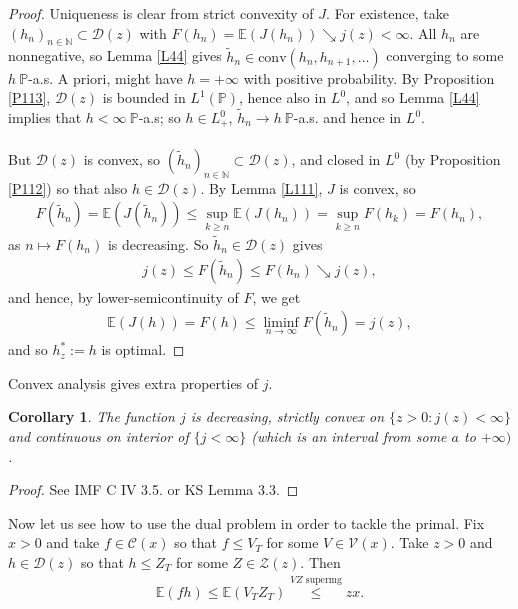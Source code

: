\documentclass[12pt,a4paper, twoside]{article}
\newtheorem{cor}{Corollary}[section]
\theoremstyle{definition}
\newcommand{\EE}{\mathbb{E}} %
\newcommand{\PP}{\mathbb{P}} %
\begin{document}
\begin{proof}
Uniqueness is clear  from strict convexity of $J$. For existence, take $(h_n)_{n \in \mathbb{N}} \subset \mathcal{D}(z)$ with $F(h_n)= \EE(J(h_n)) \searrow j(z) < \infty$. All $h_n$ are nonnegative, so Lemma \ref{L44} gives $\widetilde{h}_n \in \text{conv}(h_n, h_{n+1}, \dots )$ converging to some $h \ \PP$-a.s. A priori, might have $h= + \infty$ with positive probability. By Proposition \ref{P113}, $\mathcal{D}(z)$ is bounded in $L^1( \PP)$, hence also in $L^0$, and so Lemma \ref{L44} implies that $h < \infty \ \PP$-a.s; so $h \in L_+^0$, $\widetilde{h}_n \to h \ \PP$-a.s. and hence in $L^0$. \\
\\
But $\mathcal{D}(z)$ is convex, so $(\widetilde{h}_n)_{n \in \mathbb{N}} \subset \mathcal{D}(z)$, and closed in $L^0$ (by Proposition \ref{P112}) so that also $h \in \mathcal{D}(z)$. By Lemma \ref{L111}, $J$ is convex, so
\begin{align*}
F( \widetilde{h}_n) = \EE(J( \widetilde{h}_n)) \leq \sup_{k \geq n} \EE(J(h_n)) = \sup_{k \geq n } F(h_k) = F(h_n),
\end{align*}
as $n \mapsto F(h_n)$ is decreasing. So $\widetilde{h}_n \in \mathcal{D}(z)$ gives 
\begin{align*}
j(z) \leq F( \widetilde{h}_n) \leq F(h_n) \searrow j(z),
\end{align*}
and hence, by lower-semicontinuity of $F$, we get
\begin{align*}
\EE(J(h)) = F(h) \leq \liminf_{n \to \infty} F( \widetilde{h}_n) = j(z),
\end{align*}
and so $h_z^* := h$ is optimal. 
\end{proof}
Convex analysis gives extra properties of $j$.
\begin{cor} \label{C115} The function $j$ is decreasing, strictly convex on $\{ z >0: j(z) < \infty\}$ and continuous on interior of $\{j < \infty\}$ (which is an interval from some $a$ to $+ \infty)$.
\end{cor}
\begin{proof}
See IMF C IV 3.5. or KS Lemma 3.3.
\end{proof}
Now let us see how to use the dual problem in order to tackle the primal. Fix $x>0$ and take $f \in \mathcal{C}(x)$ so that $f \leq V_T$ for some $V \in \mathcal{V}(x)$. Take $z>0$ and $h \in \mathcal{D}(z)$ so that $h \leq Z_T$ for some $Z \in \mathcal{Z}(z)$. Then 
\begin{align*}
\EE(fh) \leq \EE(V_T Z_T) \overset{VZ \text{ supermg}}\leq zx.
\end{align*}
\end{document}
